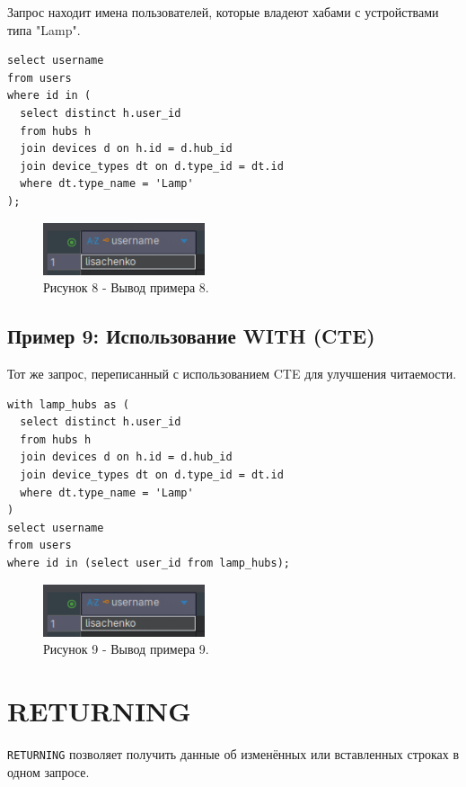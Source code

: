 \documentclass[oneside,a4paper,14pt]{extarticle}
\begin{document}
Запрос находит имена пользователей, которые владеют хабами с устройствами типа "Lamp".

\begin{verbatim}
select username 
from users 
where id in (
  select distinct h.user_id 
  from hubs h 
  join devices d on h.id = d.hub_id
  join device_types dt on d.type_id = dt.id
  where dt.type_name = 'Lamp'
);
\end{verbatim}

\begin{figure}[H]
  \centering
  \includegraphics[width=0.425\textwidth]{pics/subquery.png}
  \caption*{Рисунок 8 - Вывод примера 8.}
\end{figure}

\subsection*{Пример 9: Использование WITH (CTE)}

Тот же запрос, переписанный с использованием CTE для улучшения читаемости.

\begin{verbatim}
with lamp_hubs as (
  select distinct h.user_id 
  from hubs h 
  join devices d on h.id = d.hub_id
  join device_types dt on d.type_id = dt.id
  where dt.type_name = 'Lamp'
)
select username 
from users 
where id in (select user_id from lamp_hubs);
\end{verbatim}

\begin{figure}[H]
  \centering
  \includegraphics[width=0.425\textwidth]{pics/subquery.png}
  \caption*{Рисунок 9 - Вывод примера 9.}
\end{figure}

\section*{RETURNING}

\texttt{RETURNING} позволяет получить данные об изменённых или вставленных строках в одном запросе.
\end{document}
